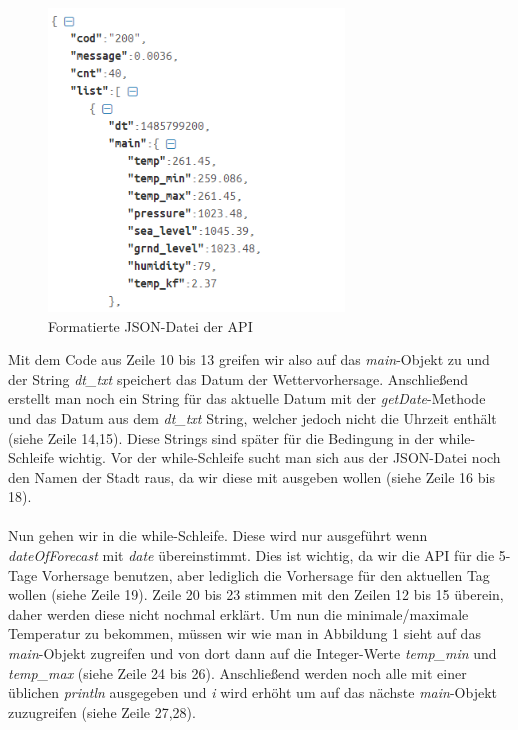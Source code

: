 \begin{figure}[htbp]
\begin{center}
\includegraphics[width=0.7\textwidth]{Bild1}
\caption{Formatierte JSON-Datei der API}
\end{center}
\end{figure}

Mit dem Code aus Zeile 10 bis 13 greifen wir also auf das \textit{main}-Objekt zu und der String \textit{dt\_txt} speichert das Datum der Wettervorhersage. Anschließend erstellt man noch ein String für das aktuelle Datum mit der \textit{getDate}-Methode und das Datum aus dem \textit{dt\_txt} String, welcher jedoch nicht die Uhrzeit enthält (siehe Zeile 14,15). Diese Strings sind später für die Bedingung in der while-Schleife wichtig. Vor der while-Schleife sucht man sich aus der JSON-Datei noch den Namen der Stadt raus, da wir diese mit ausgeben wollen (siehe Zeile 16 bis 18).\cite{[6]} \\
\\
Nun gehen wir in die while-Schleife. Diese wird nur ausgeführt wenn \textit{dateOfForecast} mit \textit{date} übereinstimmt. Dies ist wichtig, da wir die API für die 5-Tage Vorhersage benutzen, aber lediglich die Vorhersage für den aktuellen Tag wollen (siehe Zeile 19). Zeile 20 bis 23 stimmen mit den Zeilen 12 bis 15 überein, daher werden diese nicht nochmal erklärt. Um nun die minimale/maximale Temperatur zu bekommen, müssen wir wie man in Abbildung 1 sieht auf das \textit{main}-Objekt zugreifen und von dort dann auf die Integer-Werte \textit{temp\_min} und  \textit{temp\_max} (siehe Zeile 24 bis 26). Anschließend werden noch alle mit einer üblichen \textit{println} ausgegeben und \textit{i} wird erhöht um auf das nächste \textit{main}-Objekt zuzugreifen (siehe Zeile 27,28).


